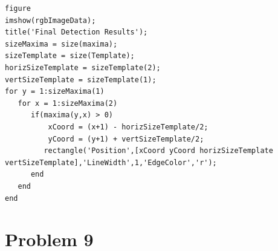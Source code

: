 \documentclass[11pt,psfig]{article}
\begin{document}
\begin{verbatim}
figure
imshow(rgbImageData);
title('Final Detection Results');
sizeMaxima = size(maxima);
sizeTemplate = size(Template);
horizSizeTemplate = sizeTemplate(2);
vertSizeTemplate = sizeTemplate(1);
for y = 1:sizeMaxima(1)
   for x = 1:sizeMaxima(2)
      if(maxima(y,x) > 0)
          xCoord = (x+1) - horizSizeTemplate/2;
          yCoord = (y+1) + vertSizeTemplate/2;
         rectangle('Position',[xCoord yCoord horizSizeTemplate vertSizeTemplate],'LineWidth',1,'EdgeColor','r');
      end
   end
end

\end{verbatim}

\newpage

\section*{Problem 9}
\end{document}
